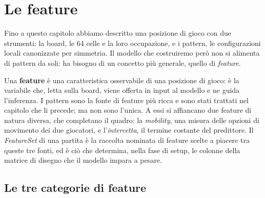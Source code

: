 %
%
%
%
%
%
%
%
\chapter{Le feature}
\label{ch:feature}

Fino a questo capitolo abbiamo descritto una posizione di gioco con due strumenti: la
board, le 64 celle e la loro occupazione, e i pattern, le configurazioni locali
canonizzate per simmetria. Il modello che costruiremo però non si alimenta di pattern
da soli: ha bisogno di un concetto più generale, quello di \textit{feature}.

Una \textbf{feature} è una caratteristica osservabile di una posizione di gioco: è la
variabile che, letta sulla board, viene offerta in input al modello e ne guida
l'inferenza. I pattern sono la fonte di feature più ricca e sono stati trattati nel
capitolo che li precede; ma non sono l'unica. A essi si affiancano due feature di
natura diversa, che completano il quadro: la \textit{mobility}, una misura delle
opzioni di movimento dei due giocatori, e l'\textit{intercetta}, il termine costante
del predittore. Il \textit{FeatureSet} di una partita è la raccolta nominata di
feature scelte a piacere tra queste tre fonti, ed è ciò che determina, nella fase di
setup, le colonne della matrice di disegno che il modello impara a pesare.

\section{Le tre categorie di feature}

